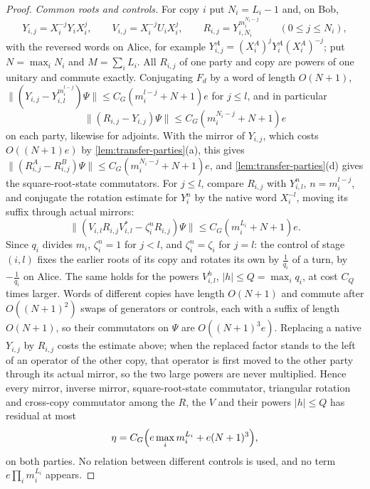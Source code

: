 \begin{proof}
\emph{Common roots and controls.} For copy $i$ put $N_i=L_i-1$ and, on Bob,
\[
Y_{i,j}=X_i^{-j}Y_iX_i^j,\qquad V_{i,j}=X_i^{-j}U_iX_i^j,\qquad R_{i,j}=Y_{i,N_i}^{m_i^{N_i-j}}\qquad(0\le j\le N_i),
\]
with the reversed words on Alice, for example $Y^A_{i,j}=(X_i^A)^jY_i^A(X_i^A)^{-j}$; put $N=\max_iN_i$ and $M=\sum_iL_i$. All $R_{i,j}$ of
one party and copy are powers of one unitary and commute exactly. Conjugating $F_d$ by a word of length $O(N+1)$,
$\|(Y_{i,j}-Y_{i,l}^{m_i^{l-j}})\Psi\|\le C_G(m_i^{l-j}+N+1)e$ for $j\le l$, and in particular
\[
\|(R_{i,j}-Y_{i,j})\Psi\|\le C_G(m_i^{N_i-j}+N+1)e
\]
on each party, likewise for adjoints. With the mirror of $Y_{i,j}$, which costs $O((N+1)e)$ by \cref{lem:transfer-parties}(a), this gives
$\|(R^A_{i,j}-R^B_{i,j})\Psi\|\le C_G(m_i^{N_i-j}+N+1)e$, and \cref{lem:transfer-parties}(d) gives the square-root-state commutators. For
$j\le l$, compare $R_{i,j}$ with $Y_{i,l}^{n}$, $n=m_i^{l-j}$, and conjugate the rotation estimate for $Y_i^n$ by the native word
$X_i^{-l}$, moving its suffix through actual mirrors:
\[
\|(V_{i,l}R_{i,j}V_{i,l}^*-\zeta_i^{n}R_{i,j})\Psi\|\le C_G(m_i^{L_i}+N+1)e .
\]
Since $q_i$ divides $m_i$, $\zeta_i^n=1$ for $j<l$, and $\zeta_i^n=\zeta_i$ for $j=l$: the control of stage $(i,l)$ fixes the earlier roots
of its copy and rotates its own by $\frac1{q_i}$ of a turn, by $-\frac1{q_i}$ on Alice. The same holds for the powers $V_{i,l}^h$,
$|h|\le Q=\max_iq_i$, at cost $C_Q$ times larger. Words of different copies have length $O(N+1)$ and commute after $O((N+1)^2)$ swaps of
generators or controls, each with a suffix of length $O(N+1)$, so their commutators on $\Psi$ are $O((N+1)^3e)$. Replacing a native
$Y_{i,j}$ by $R_{i,j}$ costs the estimate above; when the replaced factor stands to the left of an operator of the other copy, that
operator is first moved to the other party through its actual mirror, so the two large powers are never multiplied. Hence every mirror,
inverse mirror, square-root-state commutator, triangular rotation and cross-copy commutator among the $R$, the $V$ and their powers
$|h|\le Q$ has residual at most
\[
\eta=C_G\Bigl(e\max_im_i^{L_i}+e(N+1)^3\Bigr),
\]
on both parties. No relation between different controls is used, and no term $e\prod_im_i^{L_i}$ appears.


\end{proof}
